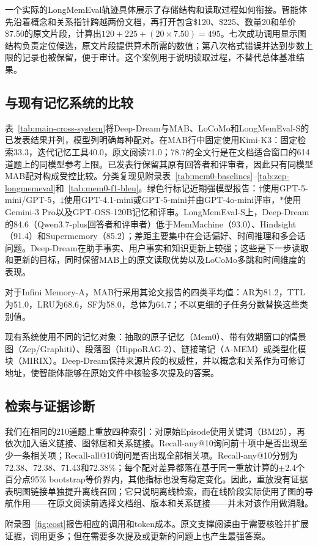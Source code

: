 



一个实际的LongMemEval轨迹具体展示了存储结构和读取过程如何衔接。智能体先沿着概念和关系指针跨越两份文档，再打开包含\$120、\$225、数量20和单价\$7.50的原文片段，计算出$120+225+(20\times7.50)=495$。七次成功调用显示图结构负责定位候选，原文片段提供算术所需的数值；第八次格式错误并达到步数上限的记录也被保留，便于审计。这个案例用于说明读取过程，不替代总体基准结果。

\subsection{与现有记忆系统的比较}
\label{sec:cross-system}

表~\ref{tab:main-cross-system}将Deep-Dream与MAB、LoCoMo和LongMemEval-S的已发表结果并列，模型列明确每种配对。在MAB行中固定使用Kimi-K3：固定检索33.3，迭代记忆工具40.0，原文阅读71.0；78.7的全文行是在文档适合窗口的614道题上的同模型参考上限。已发表行保留其原有回答者和评审者，因此只有同模型MAB配对构成受控比较。分类复现见附录表~\ref{tab:mem0-baselines}--\ref{tab:zep-longmemeval}和~\ref{tab:mem0-f1-bleu}。绿色行标记近期强模型报告：$\dagger$使用GPT-5-mini/GPT-5，$\ddagger$使用GPT-4.1-mini或GPT-5-mini并由GPT-4o-mini评审，$\ast$使用Gemini-3 Pro以及GPT-OSS-120B记忆和评审\citep{ji2026infini,wang2026memmachine,latimer2025hindsight}。LongMemEval-S上，Deep-Dream的84.6（Qwen3.7-plus回答者和评审者）低于MemMachine（93.0）、Hindsight（91.4）和Supermemory（85.2）；差距主要集中在会话偏好、时间推理和多会话问题。Deep-Dream在助手事实、用户事实和知识更新上较强；这些是下一步读取和更新的目标，同时保留MAB上的原文读取优势以及LoCoMo多跳和时间维度的表现。

对于Infini Memory-A，MAB行采用其论文报告的四类平均值：AR为81.2，TTL为51.0，LRU为68.6，SF为58.0，总体为64.7；不以更细的子任务分数替换这些类别值。



现有系统使用不同的记忆对象：抽取的原子记忆（Mem0）、带有效期窗口的情景图（Zep/Graphiti）、段落图（HippoRAG-2）、链接笔记（A-MEM）或类型化模块（MIRIX）。Deep-Dream保持来源片段的权威性，并以概念和关系作为可修订地址，使智能体能够在原始文件中核验多次提及的答案。

\subsection{检索与证据诊断}
\label{sec:external-comparisons}
\label{sec:provenance-ablation}

我们在相同的210道题上重放四种索引：对原始Episode使用关键词（BM25），再依次加入语义链接、图邻居和关系链接。Recall-any@10询问前十项中是否出现至少一条相关项；Recall-all@10询问是否出现全部相关项。Recall-any@10分别为72.38、72.38、71.43和72.38\%；每个配对差异都落在基于同一重放计算的$\pm$2.4个百分点95\% bootstrap等价界内，其他指标也没有稳定变化。因此，重放没有证据表明图链接单独提升离线召回；它只说明离线检索，而在线阶段实际使用了图的导航作用——在原文阅读前选择文档组、版本和关系链接——并未对该作用做消融。

附录图~\ref{fig:cost}报告相应的调用和token成本。原文支撑阅读由于需要核验并扩展证据，调用更多；但在需要多次提及或更新的问题上也产生最强答案。
